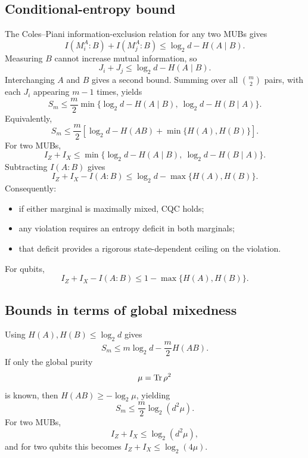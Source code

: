 \subsection{Conditional-entropy bound}

The Coles--Piani information-exclusion relation for any two MUBs gives \cite{ColesPiani2014,Iqbal2026}
\begin{equation}
I(M_i^A:B)+I(M_j^A:B)\le\log_2d-H(A\mid B).
\end{equation}
Measuring $B$ cannot increase mutual information, so
\begin{equation}
J_i+J_j\le\log_2d-H(A\mid B).
\end{equation}
Interchanging $A$ and $B$ gives a second bound. Summing over all $\binom{m}{2}$ pairs, with each $J_i$ appearing $m-1$ times, yields
\begin{equation}
S_m\le\frac{m}{2}\min\{\log_2d-H(A\mid B),\ \log_2d-H(B\mid A)\}.
\end{equation}
Equivalently,
\begin{equation}
S_m\le\frac{m}{2}\left[\log_2d-H(AB)+\min\{H(A),H(B)\}\right].
\end{equation}
For two MUBs,
\begin{equation}
I_Z+I_X\le\min\{\log_2d-H(A\mid B),\ \log_2d-H(B\mid A)\}.
\end{equation}
Subtracting $I(A:B)$ gives
\begin{equation}
I_Z+I_X-I(A:B)\le\log_2d-\max\{H(A),H(B)\}.
\end{equation}
Consequently:
\begin{itemize}
\item if either marginal is maximally mixed, CQC holds;
\item any violation requires an entropy deficit in both marginals;
\item that deficit provides a rigorous state-dependent ceiling on the violation.
\end{itemize}
For qubits,
\begin{equation}
I_Z+I_X-I(A:B)\le1-\max\{H(A),H(B)\}.
\end{equation}

\subsection{Bounds in terms of global mixedness}

Using $H(A),H(B)\le\log_2d$ gives
\begin{equation}
S_m\le m\log_2d-\frac{m}{2}H(AB).
\end{equation}
If only the global purity
\begin{equation}
\mu=\operatorname{Tr}\rho^2
\end{equation}
is known, then $H(AB)\ge-\log_2\mu$, yielding
\begin{equation}
S_m\le\frac{m}{2}\log_2(d^2\mu).
\end{equation}
For two MUBs,
\begin{equation}
I_Z+I_X\le\log_2(d^2\mu),
\end{equation}
and for two qubits this becomes $I_Z+I_X\le\log_2(4\mu)$.

